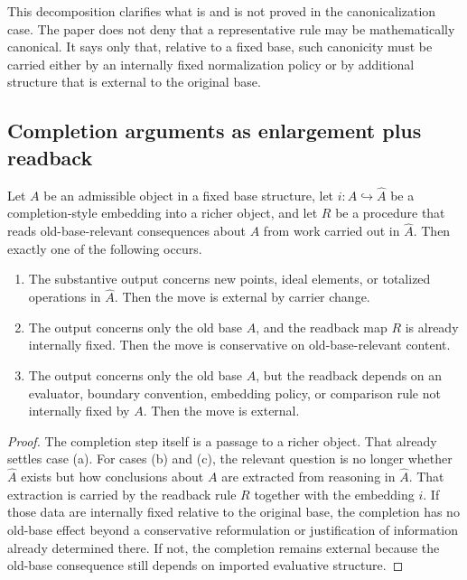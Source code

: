 \begin{remark}
This decomposition clarifies what is and is not proved in the canonicalization case. The paper does not deny that a representative rule may be mathematically canonical. It says only that, relative to a fixed base, such canonicity must be carried either by an internally fixed normalization policy or by additional structure that is external to the original base.
\end{remark}

\subsection{Completion arguments as enlargement plus readback}

\begin{proposition}\label{prop:app-completion-readback}
Let $A$ be an admissible object in a fixed base structure, let $i:A\hookrightarrow \widehat{A}$ be a completion-style embedding into a richer object, and let $R$ be a procedure that reads old-base-relevant consequences about $A$ from work carried out in $\widehat{A}$. Then exactly one of the following occurs.
\begin{enumerate}[label=(\alph*)]
    \item The substantive output concerns new points, ideal elements, or totalized operations in $\widehat{A}$. Then the move is external by carrier change.
    \item The output concerns only the old base $A$, and the readback map $R$ is already internally fixed. Then the move is conservative on old-base-relevant content.
    \item The output concerns only the old base $A$, but the readback depends on an evaluator, boundary convention, embedding policy, or comparison rule not internally fixed by $A$. Then the move is external.
\end{enumerate}
\end{proposition}

\begin{proof}
The completion step itself is a passage to a richer object. That already settles case (a). For cases (b) and (c), the relevant question is no longer whether $\widehat{A}$ exists but how conclusions about $A$ are extracted from reasoning in $\widehat{A}$. That extraction is carried by the readback rule $R$ together with the embedding $i$. If those data are internally fixed relative to the original base, the completion has no old-base effect beyond a conservative reformulation or justification of information already determined there. If not, the completion remains external because the old-base consequence still depends on imported evaluative structure.
\end{proof}

